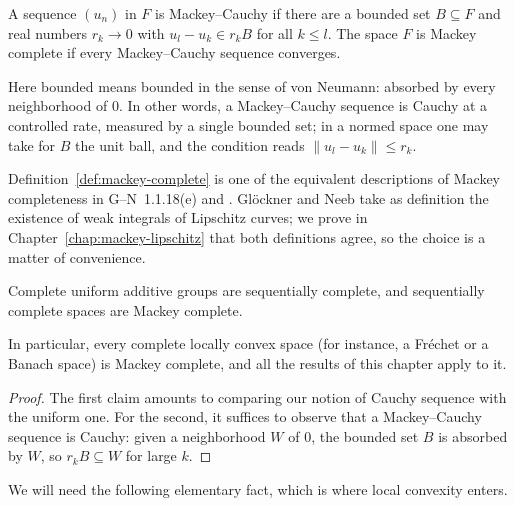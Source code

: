 \begin{definition}
  \label{def:mackey-complete}
  \leanok
  A sequence $(u_n)$ in $F$ is Mackey--Cauchy if there are a bounded set $B \subseteq F$ and
  real numbers $r_k \to 0$ with $u_l - u_k \in r_k B$ for all $k \leq l$. The space $F$ is
  Mackey complete if every Mackey--Cauchy sequence converges.
\end{definition}

Here bounded means bounded in the sense of von Neumann: absorbed by every neighborhood of $0$.
In other words, a Mackey--Cauchy sequence is Cauchy at a controlled rate, measured by a single
bounded set; in a normed space one may take for $B$ the unit ball, and the condition reads
$\|u_l - u_k\| \leq r_k$.

\begin{remark}
  Definition~\ref{def:mackey-complete} is one of the equivalent descriptions of Mackey
  completeness in G--N~1.1.18(e) and \cite[2.2, 2.14]{KM97}. Glöckner and Neeb take as
  definition the existence of weak integrals of Lipschitz curves; we prove in
  Chapter~\ref{chap:mackey-lipschitz} that both definitions agree, so the choice is a matter of
  convenience.
\end{remark}

\begin{proposition}[Comparison]
  \label{prop:completeness-chain}
  \leanok
  Complete uniform additive groups are sequentially complete, and sequentially complete spaces
  are Mackey complete.
\end{proposition}

In particular, every complete locally convex space (for instance, a Fréchet or a Banach space)
is Mackey complete, and all the results of this chapter apply to it.

\begin{proof}
  \leanok
  The first claim amounts to comparing our notion of Cauchy sequence with the uniform one. For
  the second, it suffices to observe that a Mackey--Cauchy sequence is Cauchy: given a
  neighborhood $W$ of $0$, the bounded set $B$ is absorbed by $W$, so $r_k B \subseteq W$ for
  large $k$.
\end{proof}

We will need the following elementary fact, which is where local convexity enters.

